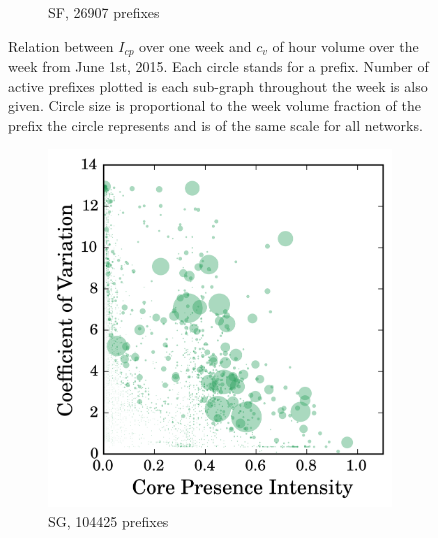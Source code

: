 \begin{figure}
\begin{subfigure}[b]{0.49\textwidth}
                \caption{SF, 26907 prefixes}
                \label{fig:cv_cp_sf}
        \end{subfigure}
\caption{Relation between $I_{cp}$ over one week and $c_v$ of hour volume over the week from June 1st, 2015. Each circle stands for a prefix. Number of active prefixes plotted is each sub-graph throughout the week is also given. Circle size is proportional to the week volume fraction of the prefix the circle represents and is of the same scale for all networks.}
\label{fig:cv_cp}
\end{figure}
\begin{figure}\ContinuedFloat
        \begin{subfigure}[b]{0.49\textwidth}
                \includegraphics[width=\textwidth]{gfx/chap2/corre_cv_cp_sg.png}
                \caption{SG, 104425 prefixes}
                \label{fig:cv_cp_sg}
        \end{subfigure}
        \begin{subfigure}[b]{0.49\textwidth}

\end{subfigure}
\end{figure}
